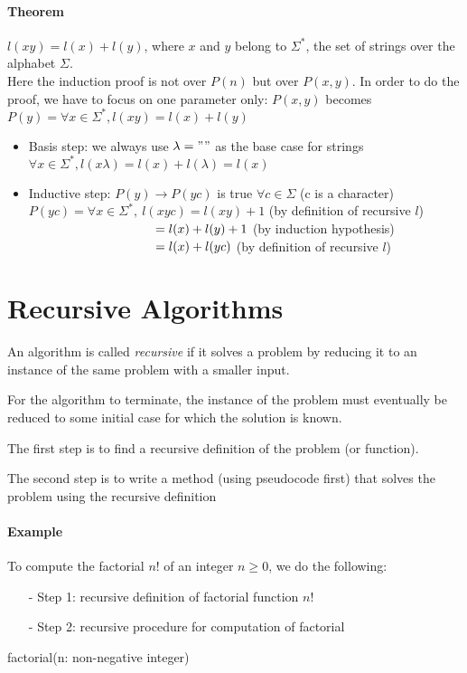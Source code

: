 \documentclass[10pt,a4paper]{book}
\begin{document}
\paragraph*{Theorem}
$l(xy)=l(x)+l(y)$, where $x$ and $y$ belong to $\Sigma^{*}$, the set of strings over the alphabet $\Sigma$.\\
Here the induction proof is not over $P(n)$ but over $P(x,y)$. In order to do the proof, we have to focus on one parameter only: $P(x,y)$ becomes $P(y)= \forall x \in \Sigma^{*}, l(xy)=l(x)+l(y)$
\begin{itemize}
\item Basis step: we always use $\lambda = ""$ as the base case for strings\\
$\forall x \in \Sigma^{*}, l(x\lambda) = l(x)+l(\lambda) = l(x)$
\item Inductive step: $P(y) \to P(yc)$ is true $\forall c \in \Sigma$ (c is a character)\\
$P(yc) = \forall x \in \Sigma^{*},\ l(xyc) = l(xy) + 1$ (by definition of recursive $l$)\\
$\hspace*{100pt} = l(x) + l(y) +1$ (by induction hypothesis)\\
$\hspace*{100pt} = l(x) + l(yc)$ (by definition of recursive $l$)
\end{itemize}
\section{Recursive Algorithms}
An algorithm is called \textit{recursive} if it solves a problem by reducing it to an instance of the same problem with a smaller input.\par
For the algorithm to terminate, the instance of the problem must eventually be reduced to some initial case for which the solution is known.\par 
The first step is to find a recursive definition of the problem (or function).\par 
The second step is to write a method (using pseudocode first) that solves the problem using the recursive definition
\paragraph*{Example}
To compute the factorial $n!$ of an integer $n \geqslant 0$, we do the following:
\begin{enumerate}
\item[-] Step 1: recursive definition of factorial function $n!$
\item[-] Step 2: recursive procedure for computation of factorial
\end{enumerate}
\begin{procedure}
\caption{factorial(n: non-negative integer)}
\DontPrintSemicolon
\SetAlgoNoEnd

\end{procedure}
\end{document}
